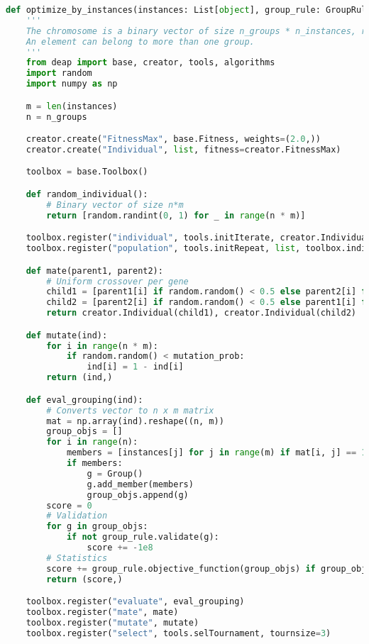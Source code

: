 \begin{apendicesenv}
\begin{lstlisting}[language=Python, caption={Genetic Algorithm Solver Source Code}]
def optimize_by_instances(instances: List[object], group_rule: GroupRule, n_groups=3, n_generations=10000, pop_size=40, mutation_prob=0.5) -> List[Group]:
    '''
    The chromosome is a binary vector of size n_groups * n_instances, representing a n_groups x n_instances matrix.
    An element can belong to more than one group.
    '''
    from deap import base, creator, tools, algorithms
    import random
    import numpy as np

    m = len(instances)
    n = n_groups

    creator.create("FitnessMax", base.Fitness, weights=(2.0,))
    creator.create("Individual", list, fitness=creator.FitnessMax)

    toolbox = base.Toolbox()

    def random_individual():
        # Binary vector of size n*m
        return [random.randint(0, 1) for _ in range(n * m)]

    toolbox.register("individual", tools.initIterate, creator.Individual, random_individual)
    toolbox.register("population", tools.initRepeat, list, toolbox.individual)

    def mate(parent1, parent2):
        # Uniform crossover per gene
        child1 = [parent1[i] if random.random() < 0.5 else parent2[i] for i in range(n * m)]
        child2 = [parent2[i] if random.random() < 0.5 else parent1[i] for i in range(n * m)]
        return creator.Individual(child1), creator.Individual(child2)

    def mutate(ind):
        for i in range(n * m):
            if random.random() < mutation_prob:
                ind[i] = 1 - ind[i]
        return (ind,)

    def eval_grouping(ind):
        # Converts vector to n x m matrix
        mat = np.array(ind).reshape((n, m))
        group_objs = []
        for i in range(n):
            members = [instances[j] for j in range(m) if mat[i, j] == 1]
            if members:
                g = Group()
                g.add_member(members)
                group_objs.append(g)
        score = 0
        # Validation
        for g in group_objs:
            if not group_rule.validate(g):
                score += -1e8
        # Statistics
        score += group_rule.objective_function(group_objs) if group_objs else 0
        return (score,)

    toolbox.register("evaluate", eval_grouping)
    toolbox.register("mate", mate)
    toolbox.register("mutate", mutate)
    toolbox.register("select", tools.selTournament, tournsize=3)


\end{lstlisting}
\end{apendicesenv}
